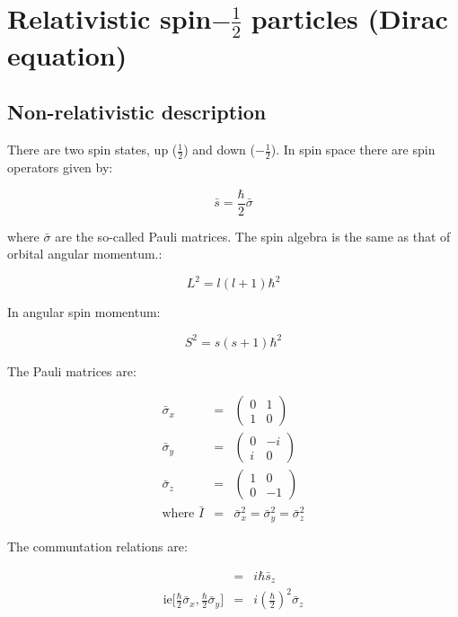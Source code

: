\chapter{Relativistic spin\texorpdfstring{$-\frac{1}{2}$}{-1Over2} particles (Dirac equation)}

\section{Non-relativistic description}

There are two spin states, up ($\frac{1}{2}$) and down ($-\frac{1}{2}$).  In spin space there are spin operators given by:

\[
  \bar{s} = \frac{\hbar}{2}\bar{\sigma}
\]

where $\bar{\sigma}$ are the so-called Pauli matrices.  The spin algebra is the same as that of orbital angular momentum.:

\[
  L^2 = l(l+1)\hbar^2
\]

In angular spin momentum:

\[
  S^2 = s(s+1)\hbar^2
\]

The Pauli matrices are:

\begin{eqnarray*}
  \bar{\sigma}_x & = &
  \left(
    \begin{array}{cc}
    0 & 1 \\
    1 & 0
    \end{array}
  \right)
  \\
  \bar{\sigma}_y & = &
  \left(
    \begin{array}{cc}
    0 & -i \\
    i & 0
    \end{array}
  \right)
  \\
  \bar{\sigma}_z & = &
  \left(
    \begin{array}{cc}
    1 & 0 \\
    0 & -1
    \end{array}
  \right)
  \\
  \textrm{where } \bar{I} & = & \bar{\sigma}_x^2 = \bar{\sigma}_y^2 = \bar{\sigma}_z^2
\end{eqnarray*}

The communtation relations are: \nopagebreak

\begin{eqnarray*}
  [\bar{s}_x,\bar{s}_y] & = & i\hbar \bar{s}_z \\
  \textrm{ie} \Bigg[ \frac{\hbar}{2}\bar{\sigma}_x,\frac{\hbar}{2}\bar{\sigma}_y \Bigg] & = & i\left(\frac{\hbar}{2}\right)^2\bar{\sigma}_z
\end{eqnarray*}

